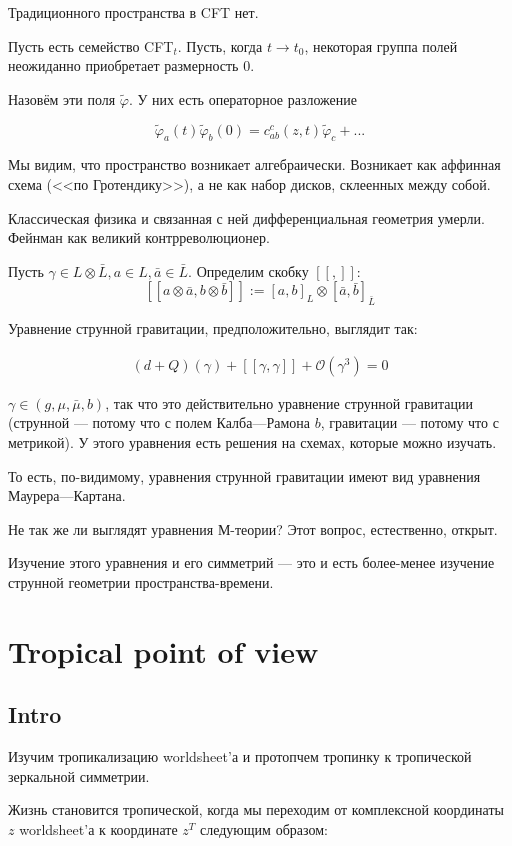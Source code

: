 \documentclass[11pt]{article}
\def\be{\numberwithin{equation}{section}\begin{eqnarray}}
\def\ee{\end{eqnarray}}
\def\ph{\varphi}
\theoremstyle{remark}
\theoremstyle{definition}
\begin{document}
Традиционного пространства в CFT нет.

Пусть есть семейство CFT$_t$. Пусть, когда $t \to t_0$, некоторая группа полей неожиданно приобретает размерность 0.

Назовём эти поля $\tilde \ph$. У них есть операторное разложение

$$\tilde \ph_a (t) \tilde \ph_b (0) = c_{ab}^c (z,t) \tilde \ph_c + ...$$

Мы видим, что пространство возникает алгебраически. Возникает как аффинная схема (<<по Гротендику>>), а не как набор дисков, склеенных между собой.



Классическая физика и связанная с ней дифференциальная геометрия умерли. Фейнман как великий контрреволюционер.

Пусть $\gamma \in L \otimes \bar L, a \in L, \bar a \in \bar L$. Определим скобку $[[,]]$: $$[[a \otimes \bar a, b \otimes \bar b]] := [a, b]_L \otimes [\bar a, \bar b]_{\bar L}$$

Уравнение струнной гравитации, предположительно, выглядит так:

\be (d+Q) (\gamma) + [[\gamma, \gamma]] + \mathcal{O}(\gamma^3) = 0 \ee

$\gamma \in (g, \mu, \bar \mu, b)$, так что это действительно уравнение струнной гравитации (струнной --- потому что с полем Калба---Рамона $b$, гравитации --- потому что с метрикой). У этого уравнения есть решения на схемах, которые можно изучать.

То есть, по-видимому, уравнения струнной гравитации имеют вид уравнения Маурера---Картана.

Не так же ли выглядят уравнения М-теории? Этот вопрос, естественно, открыт.

Изучение этого уравнения и его симметрий --- это и есть более-менее изучение струнной геометрии пространства-времени.

\section{Tropical point of view}

\subsection{Intro}

Изучим тропикализацию worldsheet'а и протопчем тропинку к тропической зеркальной симметрии.

Жизнь становится тропической, когда мы переходим от комплексной координаты $z$ worldsheet'а к координате $z^T$ следующим образом:
\end{document}

